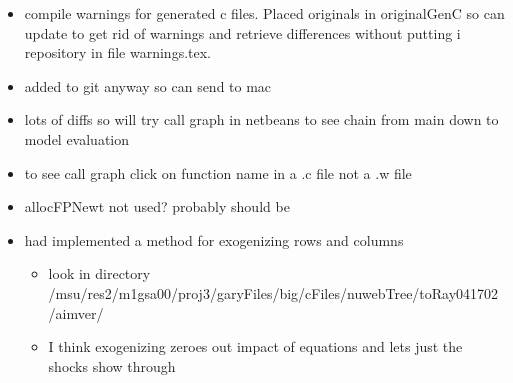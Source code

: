 \documentclass[hyperref]{labbook}
\begin{document}
\begin{itemize}


\item compile warnings for generated c files. Placed originals in originalGenC 
so can update to get rid of warnings and retrieve differences without putting i repository in file warnings.tex. 
\item added to git anyway so can send to mac

\item lots of diffs so will try call graph in netbeans to see chain from main down to model evaluation
%
\item to see call graph click on function name in a .c file not a .w file
\item allocFPNewt not used?  probably should be
\item had implemented a method for exogenizing rows and columns
  \begin{itemize}
  \item look in  directory /msu/res2/m1gsa00/proj3/garyFiles/big/cFiles/nuwebTree/toRay041702/aimver/
  \item I think exogenizing zeroes out impact of equations and lets just the shocks show through
  \end{itemize}
\end{itemize}






\end{document}
